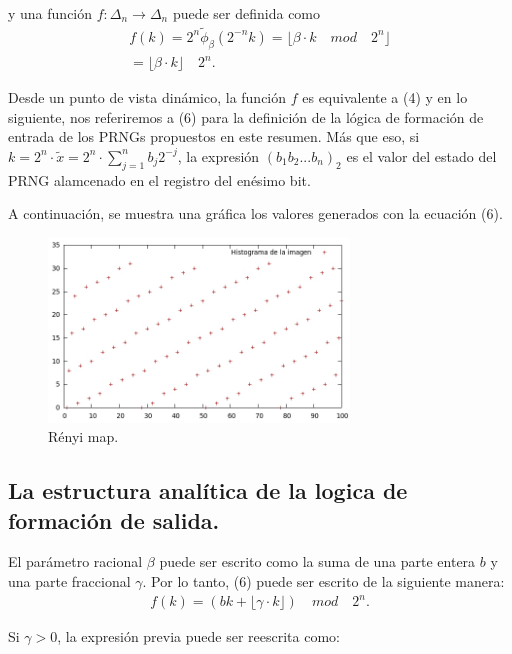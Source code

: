 \documentclass{llncs}
\begin{document}
y una función  $f: \Delta_{n} \rightarrow \Delta_{n} $ puede ser definida como 
\begin{equation}
\begin{aligned}
f(k)= 2^{n}\tilde{\phi}_{\beta}(2^{-n}k)=\lfloor \beta \cdot k \quad mod \quad 2^{n}  \rfloor \\
=\lfloor  \beta \cdot k  \rfloor \quad 2^{n}.
\end{aligned}
\end{equation}


Desde un punto de vista dinámico, la función $f$ es equivalente a (4) y en lo siguiente, nos referiremos a (6) para la definición de la lógica de formación de entrada de los PRNGs propuestos en este resumen. Más que eso, si $k = 2^{n} \cdot \tilde{x} = 2^{n} \cdot \sum_{j=1}^{n} b_{j}2^{-j} $, la expresión $(b_{1}b_{2}...b_{n})_{2}$ es el valor del estado del PRNG alamcenado en el registro del enésimo bit.

A continuación, se muestra una gráfica los valores generados con la ecuación (6).
\begin{figure}[h!]
\centering
\includegraphics[width=8cm]{a.jpg}
\caption{Rényi map.}
\label{rbasico}
\end{figure}


\subsection*{La estructura analítica de la logica de formación de salida.}
El parámetro racional $\beta$ puede ser escrito como la suma de una parte entera $b$ y una parte fraccional $\gamma$. Por lo tanto, (6) puede ser escrito de la siguiente manera: 
\begin{equation}
\begin{aligned}
f(k)= (bk + \lfloor \gamma \cdot k  \rfloor)\quad mod \quad 2^{n}.
\end{aligned}
\end{equation}

Si $\gamma >0$, la expresión previa puede ser reescrita como:
\end{document}
